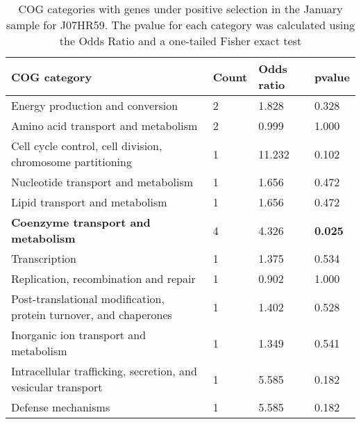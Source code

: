 \begin{table}[]
\footnotesize 
	\tabcolsep=0.11cm 
\caption{COG categories with genes under positive selection in the January sample for J07HR59. The pvalue for each category was calculated using the Odds Ratio and a one-tailed Fisher exact test} 
\begin{tabularx}{\textwidth}{L{6cm}R{2cm}R{2cm}R{2cm}} 
\hline 
\textbf{COG category} & \textbf{Count} & \textbf{Odds ratio} & \textbf{pvalue} \\ 
\hline 
Energy production and conversion & 2 & 1.828 & 0.328 \\ 
Amino acid transport and metabolism & 2 & 0.999 & 1.000 \\ 
Cell cycle control, cell division, chromosome partitioning & 1 & 11.232 & 0.102 \\ 
Nucleotide transport and metabolism & 1 & 1.656 & 0.472 \\ 
Lipid transport and metabolism & 1 & 1.656 & 0.472 \\ 
\textbf{Coenzyme transport and metabolism} & 4 & 4.326 & \textbf{0.025} \\ 
Transcription & 1 & 1.375 & 0.534 \\ 
Replication, recombination and repair & 1 & 0.902 & 1.000 \\ 
Post-translational modification, protein turnover, and chaperones & 1 & 1.402 & 0.528 \\ 
Inorganic ion transport and metabolism & 1 & 1.349 & 0.541 \\ 
Intracellular trafficking, secretion, and vesicular transport & 1 & 5.585 & 0.182 \\ 
Defense mechanisms & 1 & 5.585 & 0.182 \\ 
\end{tabularx} 
\label{January_COG_Selection_J07HR59} 
 \end{table} 

